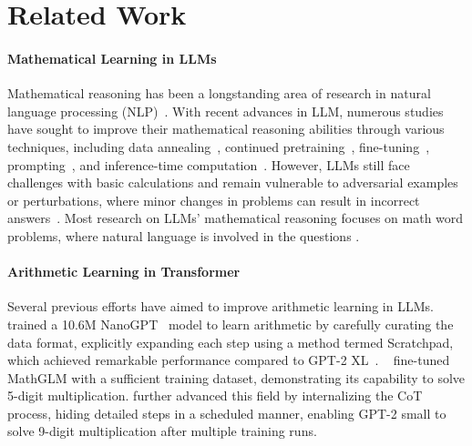 \documentclass[11pt]{article}
\begin{document}
\section{Related Work}
\paragraph{Mathematical Learning in LLMs}
Mathematical reasoning has been a longstanding area of research in natural language processing (NLP)~\citep{kushman-etal-2014-learning,huang-etal-2016-well,wang-etal-2017-deep,thawani-etal-2021-representing,Sundaram2022WhyAN,guo2024learningpatternmatchingassaying}. With recent advances in LLM, numerous studies have sought to improve their mathematical reasoning abilities through various techniques, including data annealing~\citep{dubey2024llama3herdmodels}, continued pretraining~\citep{lewkowycz2022solving}, fine-tuning~\citep{Yue2023MAmmoTHBM,liu2023improvinglargelanguagemodel}, prompting~\citep{wei2023chainofthoughtpromptingelicitsreasoning,wang2023selfconsistencyimproveschainthought}, and inference-time computation~\citep{Zhou2023LanguageAT,wu2024mathchatconversetacklechallenging}. However, LLMs still face challenges with basic calculations and remain vulnerable to adversarial examples or perturbations, where minor changes in problems can result in incorrect answers~\citep{zhou2023mathattackattackinglargelanguage,xie2024adversarialmathwordproblem}. Most research on LLMs' mathematical reasoning focuses on math word problems, where natural language is involved in the questions \citep{hendrycks2021measuringmathematicalproblemsolving, cobbe2021trainingverifierssolvemath,Arora2023HaveLA,zhao2024financemath,zhao2024docmatheval}.
\paragraph{Arithmetic Learning in Transformer}
Several previous efforts have aimed to improve arithmetic learning in LLMs.~\citet{lee2023teachingarithmeticsmalltransformers} trained a 10.6M NanoGPT~\cite{karpathy2022nanoGPT} model to learn arithmetic by carefully curating the data format, explicitly expanding each step using a method termed Scratchpad, which achieved remarkable performance compared to GPT-2 XL~\citep{radford2019language}. ~\citet{yang2023gptsolvemathematicalproblems} fine-tuned MathGLM with a sufficient training dataset, demonstrating its capability to solve 5-digit multiplication. \citet{deng2023implicitchainthoughtreasoning,deng2024explicitcotimplicitcot} further advanced this field by internalizing the CoT process, hiding detailed steps in a scheduled manner, enabling GPT-2 small to solve 9-digit multiplication after multiple training runs. 
\end{document}
